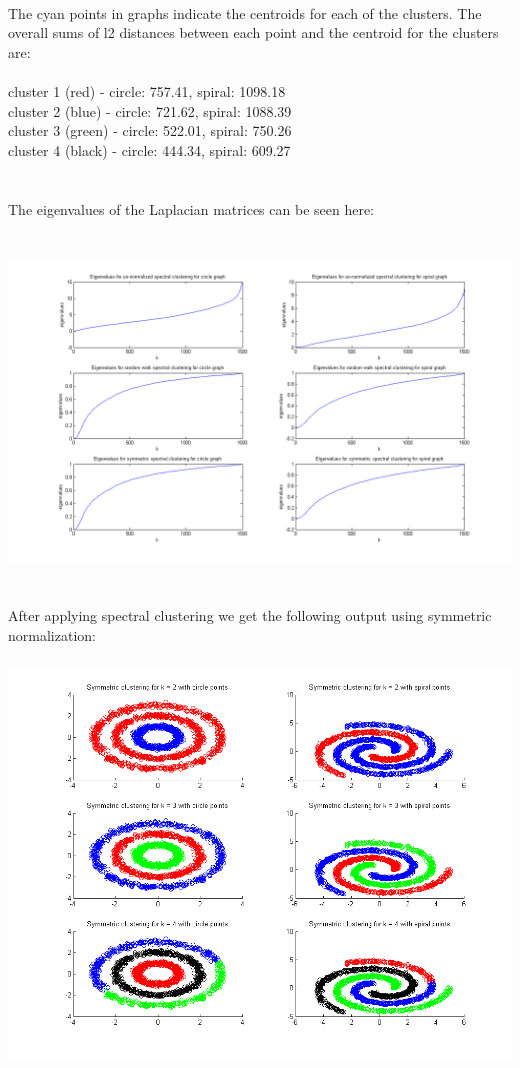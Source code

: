 \documentclass[paper=a4, fontsize=11pt]{scrartcl} %
\numberwithin{equation}{section} %
\numberwithin{figure}{section} %
\numberwithin{table}{section} %
\begin{document}
	\\\\\\
	The cyan points in graphs indicate the centroids for each of the clusters. The overall sums of l2 distances between each point and the centroid for the clusters are:
	\\\\
	cluster 1 (red) - circle: 757.41, spiral: 1098.18\\
	cluster 2 (blue) - circle: 721.62, spiral: 1088.39\\
	cluster 3 (green) - circle: 522.01, spiral: 750.26\\
	cluster 4 (black) - circle: 444.34, spiral: 609.27
	\\\\\\
	The eigenvalues of the Laplacian matrices can be seen here:
	\\\\\\
	\hspace*{-3cm}\includegraphics[scale=0.6]{eigenvalues}
	\\\\\\
	After applying spectral clustering we get the following output using symmetric normalization:
	\\\\
	\hspace*{-3cm}\includegraphics[scale=0.8]{symmetric_spectral_clustering}
\end{document}

